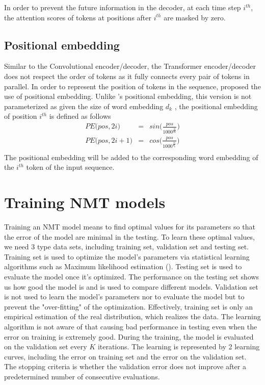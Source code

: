 In order to prevent the future information in the decoder, at each time step $i^{th}$, the attention scores of tokens at positions after $i^{th}$ are masked by zero.

\subsection{Positional embedding}
Similar to the Convolutional encoder/decoder, the Transformer encoder/decoder does not respect the order of tokens as it fully connects every pair of tokens in parallel. In order to represent the position of tokens in the sequence, \cite{Vaswani17attention} proposed the use of positional embedding. Unlike \citet{Ghering17convolutional}'s positional embedding, this version is not parameterized as given the size of word embedding $d_k$ , the positional embedding of position $i^{th}$ is defined as follows
\begin{equation}
\begin{array}{rcl}
PE\big(pos,2i\big) &=& sin \big( \frac{pos}{1000^{\frac{2i}{d_k}}} \big)\\
PE\big(pos,2i+1\big) &=& cos \big( \frac{pos}{1000^{\frac{2i}{d_k}}} \big)\\
\end{array}
\end{equation}
The positional embedding will be added to the corresponding word embedding of the $i^{th}$ token of the input sequence.
\section{Training NMT models} \label{sec:train}
Training an NMT model means to find optimal values for its parameters so that the error of the model are minimal in the testing. To learn these optimal values, we need 3 type data sets, including training set, validation set and testing set. Training set is used to optimize the model's parameters via statistical learning algorithms such as Maximum likelihood estimation ()\citep{Baum87Supervised}. Testing set is used to evaluate the model once it's optimized. The performance on the testing set shows us how good the model is and is used to compare different models. Validation set is not used to learn the model's parameters nor to evaluate the model but to prevent the "over-fitting" of the optimization. Effectively, training set is only an empirical estimation of the real distribution, which realizes the data. The learning algorithm is not aware of that causing bad performance in testing even when the error on training is extremely good. During the training, the model is evaluated on the validation set every $K$ iterations. The learning is represented by 2 learning curves, including the error on training set and the error on the validation set. The stopping criteria is whether the validation error does not improve after a predetermined number of consecutive evaluations.

